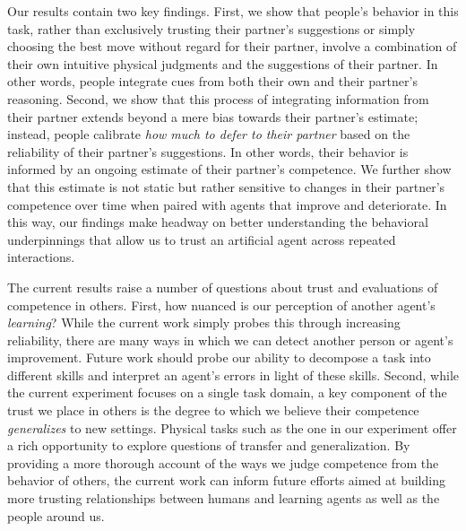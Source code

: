 \documentclass[10pt,letterpaper]{article}
\begin{document}
Our results contain two key findings. First, we show that people's behavior in this task, rather than exclusively trusting their partner's suggestions or simply choosing the best move without regard for their partner, involve a combination of their own intuitive physical judgments and the suggestions of their partner. In other words, people integrate cues from both their own and their partner's reasoning. Second, we show that this process of integrating information from their partner extends beyond a mere bias towards their partner's estimate; instead, people calibrate \textit{how much to defer to their partner} based on the reliability of their partner's suggestions. In other words, their behavior is informed by an ongoing estimate of their partner's competence. We further show that this estimate is not static but rather sensitive to changes in their partner's competence over time when paired with agents that improve and deteriorate. In this way, our findings make headway on better understanding the behavioral underpinnings that allow us to trust an artificial agent across repeated interactions. 

The current results raise a number of questions about trust and evaluations of competence in others. First, how nuanced is our perception of another agent's \textit{learning}? While the current work simply probes this through increasing reliability, there are many ways in which we can detect another person or agent's improvement. Future work should probe our ability to decompose a task into different skills and interpret an agent's errors in light of these skills. Second, while the current experiment focuses on a single task domain, a key component of the trust we place in others is the degree to which we believe their competence \textit{generalizes} to new settings. Physical tasks such as the one in our experiment offer a rich opportunity to explore questions of transfer and generalization. By providing a more thorough account of the ways we judge competence from the behavior of others, the current work can inform future efforts aimed at building more trusting relationships between humans and learning agents as well as the people around us.










\setlength{\bibleftmargin}{.125in}
\setlength{\bibindent}{-\bibleftmargin}
\typeout{} %

\end{document}
